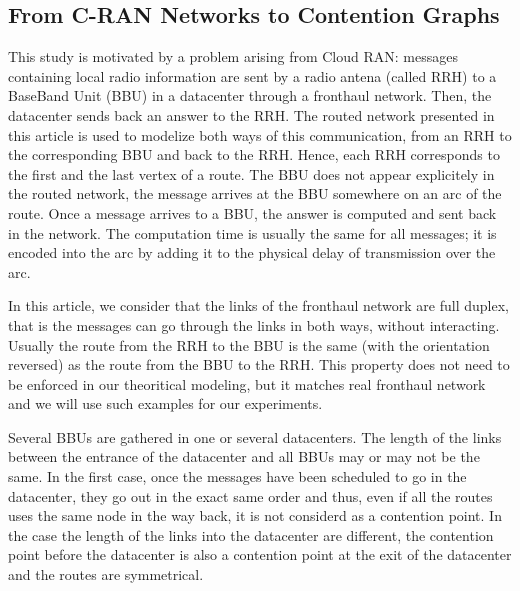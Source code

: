 \documentclass[english]{article}
\begin{document}
  \subsection{From C-RAN Networks to Contention Graphs}
  \label{subsection:CRANGRAPH}

  This study is motivated by a problem arising from Cloud RAN: messages containing local radio information are sent by a radio antena (called RRH) to a BaseBand Unit (BBU) in a datacenter through a fronthaul network. Then, the datacenter sends back an answer to the RRH. The routed network presented in this article is used to modelize both ways of this communication, from an RRH to the corresponding BBU and back to the RRH. Hence, each RRH corresponds to the first and the last vertex of a route. The BBU does not appear explicitely in the routed network, the message arrives at the BBU somewhere on an arc of the route. Once a message arrives to a BBU, the answer is computed and sent back in the network. The computation time is usually the same for all messages; it is encoded into the arc by adding it to the physical delay of transmission over the arc.
  
  In this article, we consider that the links of the fronthaul network are full duplex, that is the messages can go through the links in both ways, without interacting. Usually the route from the RRH to the BBU is the same (with the orientation reversed) as the route from the BBU to the RRH. This property does not need to be enforced in our theoritical modeling, but it matches real fronthaul network and we will use such examples for our experiments. 

  
    Several BBUs are gathered in one or several datacenters. The length of the links between the entrance of the datacenter and all BBUs may or may not be the same. In the first case, once the messages have been scheduled to go in the datacenter, they go out in the exact same order and thus, even if all the routes uses the same node in the way back, it is not considerd as a contention point. In the case the length of the links into the datacenter are different, the contention point before the datacenter is also a contention point at the exit of the datacenter and the routes are symmetrical.


\end{document}
